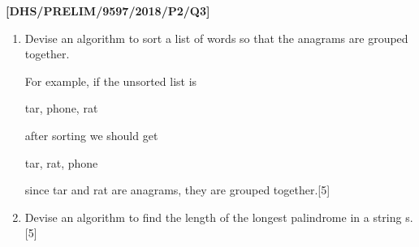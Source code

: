 \item \textbf{{[}DHS/PRELIM/9597/2018/P2/Q3{]} }
\begin{enumerate}
\item Devise an algorithm to sort a list of words so that the anagrams are
grouped together.

For example, if the unsorted list is 

tar, phone, rat

after sorting we should get

tar, rat, phone

since tar and rat are anagrams, they are grouped together.\hfill{}{[}5{]}
\item Devise an algorithm to find the length of the longest palindrome in
a string s. \hfill{}{[}5{]}
\end{enumerate}